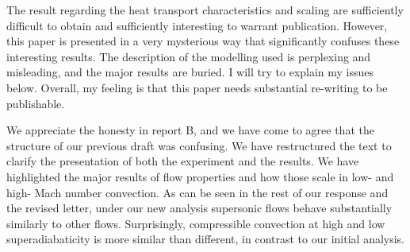 \documentclass[aps, 11pt, singlecolumn]{revtex4-1} %
\begin{document}
\begin{singlespace}
\begin{myquotation}
The result regarding the heat transport characteristics and scaling
are sufficiently difficult to obtain and sufficiently interesting to
warrant publication. However, this paper is presented in a very
mysterious way that significantly confuses these interesting results.
The description of the modelling used is perplexing and misleading,
and the major results are buried. I will try to explain my issues
below. Overall, my feeling is that this paper needs substantial
re-writing to be publishable.
\end{myquotation}
We appreciate the honesty in report B, and we have come to agree that the
structure of our previous draft was confusing.  We have restructured the text
to clarify the presentation of both the experiment and the results. 
We have highlighted the major results of flow properties and how those
scale in low- and high- Mach number convection.  As can be seen in
the rest of our response and the revised letter, under our new analysis
supersonic flows behave substantially similarly to other flows.  Surprisingly,
compressible convection at high and low superadiabaticity is more similar
than different, in contrast to our initial analysis.


\end{singlespace}
\end{document}

